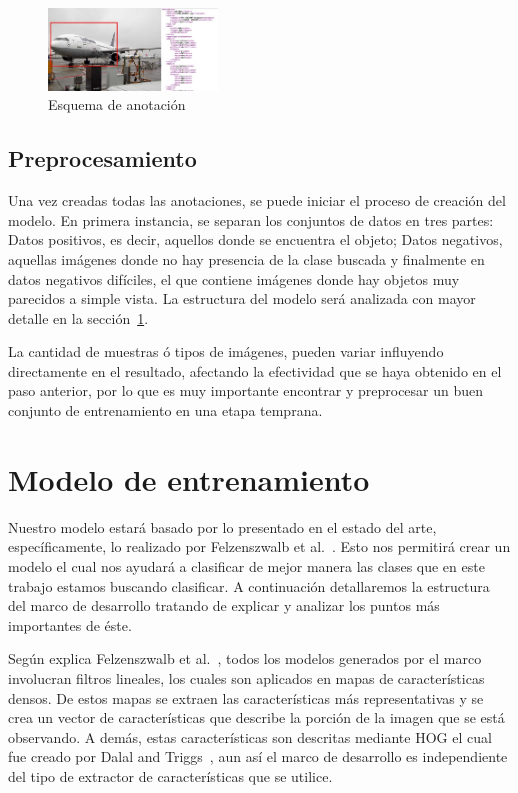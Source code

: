 \begin{figure}[tb]
  \centering
   \includegraphics[width=0.4\textwidth]{Figuras/plain-1.jpg}
   \caption{Esquema de anotación}
   \label{fig:anota}
\end{figure}

\subsection{Preprocesamiento}\label{subsec:pre}
Una vez creadas todas las anotaciones, se puede iniciar el proceso de creación del modelo. En primera instancia, se separan los conjuntos de datos en tres partes: Datos positivos, es decir, aquellos donde se encuentra el objeto; Datos negativos, aquellas imágenes donde no hay presencia de la clase buscada y finalmente en datos negativos difíciles, el que contiene imágenes donde hay objetos muy parecidos a simple vista. La estructura del modelo será analizada con mayor detalle en la sección~\ref{sec:model}.

La cantidad de muestras ó tipos de imágenes, pueden variar influyendo directamente en el resultado, afectando la efectividad que se haya obtenido en el paso anterior, por lo que es muy importante encontrar y preprocesar un buen conjunto de entrenamiento en una etapa temprana.

\section{Modelo de entrenamiento}\label{sec:model}
Nuestro modelo estará basado por lo presentado en el estado del arte, específicamente, lo realizado por Felzenszwalb et al.~\cite{Felzenszwalb2010}. Esto nos permitirá crear un modelo el cual nos ayudará a clasificar de mejor manera las clases que en este trabajo estamos buscando clasificar. A continuación detallaremos la estructura del marco de desarrollo tratando de explicar y analizar los puntos más importantes de éste.

Según explica Felzenszwalb et al.~\cite{Felzenszwalb2010}, todos los modelos generados por el marco involucran filtros lineales, los cuales son aplicados en mapas de características densos. De estos mapas se extraen las características más representativas y se crea un vector de características que describe la porción de la imagen que se está observando. A demás, estas características son descritas mediante HOG el cual fue creado por Dalal and Triggs~\cite{Dalal2005}, aun así el marco de desarrollo es independiente del tipo de extractor de características que se utilice.

